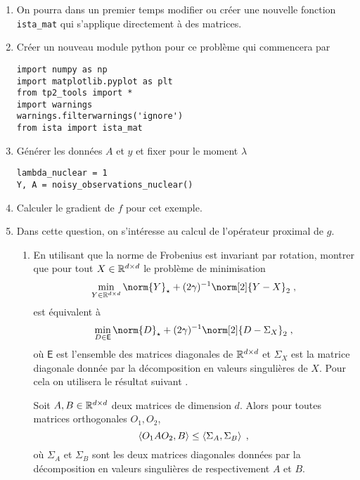 \documentclass[a4paper,french,12pt]{article}
\begin{document}
\begin{enumerate}[resume]
\item On pourra dans un premier temps modifier ou créer une nouvelle fonction \lstinline+ista_mat+ qui s'applique directement à des matrices. 
\item Créer un nouveau module python pour ce problème qui commencera par
\begin{lstlisting}
import numpy as np
import matplotlib.pyplot as plt
from tp2_tools import *
import warnings
warnings.filterwarnings('ignore')
from ista import ista_mat
\end{lstlisting}
\item Générer les données $A$ et $y$ et fixer pour le moment $\lambda$
  \begin{lstlisting}
lambda_nuclear = 1
Y, A = noisy_observations_nuclear()
  \end{lstlisting}
\item Calculer le gradient de $f$ pour cet exemple.
\item Dans cette question, on s'intéresse au calcul de l'opérateur proximal de $g$.
  \begin{enumerate}
  \item En utilisant que la norme de Frobenius est invariant par
    rotation, montrer que pour tout $X \in \mathbb{R}^{d \times d}$  le problème de minimisation
    \begin{equation}
      \label{eq:prox_nuclea_proof_1}
      \min_{Y \in \rset^{d\times d} } \norm{Y}_{\star} +(2 \gamma)^{-1} \norm[2]{Y-X}_2 \eqsp,
    \end{equation}
    est équivalent à  
          \begin{equation}
      \label{eq:prox_nuclea_proof_2}
      \min_{D \in \mathsf{E}} \norm{D}_{\star} +(2 \gamma)^{-1} \norm[2]{D-\Sigma_X}_2 \eqsp,
    \end{equation}
    où $\mathsf{E}$ est l'ensemble des matrices diagonales de $\mathbb{R}^{d \times d}$ et $\Sigma_X$ est la matrice diagonale donnée par la décomposition en valeurs singulières de $X$.
    Pour cela on utilisera le résultat suivant \cite{vonNeumann_1937}.
    \begin{theoreme}
      \label{theofr:van_neu_svd}
      Soit $A,B \in \mathbb{R}^{d \times d}$ deux matrices de dimension $d$. Alors pour toutes matrices orthogonales $O_1,O_2$,
      \begin{equation*}
        \left\langle O_1 A O_2,B \right\rangle \leq \left\langle\Sigma_A,\Sigma_B \right\rangle \;,
      \end{equation*}
      où $\Sigma_A$ et $\Sigma_B$ sont les deux matrices diagonales données par la décomposition en valeurs singulières de respectivement $A$ et $B$.

\end{theoreme}
\end{enumerate}
\end{enumerate}
\end{document}
